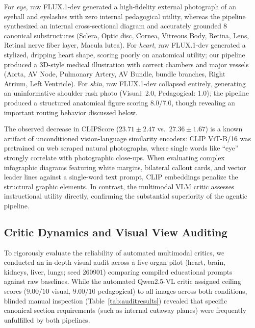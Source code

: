 \documentclass[conference]{IEEEtran}
\begin{document}
For \textit{eye}, raw FLUX.1-dev generated a high-fidelity external photograph of an eyeball and eyelashes with zero internal pedagogical utility, whereas the pipeline synthesized an internal cross-sectional diagram and accurately grounded 8 canonical substructures (Sclera, Optic disc, Cornea, Vitreous Body, Retina, Lens, Retinal nerve fiber layer, Macula lutea). For \textit{heart}, raw FLUX.1-dev generated a stylized, dripping heart shape, scoring poorly on anatomical utility; our pipeline produced a 3D-style medical illustration with correct chambers and major vessels (Aorta, AV Node, Pulmonary Artery, AV Bundle, bundle branches, Right Atrium, Left Ventricle). For \textit{skin}, raw FLUX.1-dev collapsed entirely, generating an uninformative shoulder rash photo (Visual: 2.0, Pedagogical: 1.0); the pipeline produced a structured anatomical figure scoring 8.0/7.0, though revealing an important routing behavior discussed below.

The observed decrease in CLIPScore ($23.71 \pm 2.47$ vs.\ $27.36 \pm 1.67$) is a known artifact of unconditioned vision-language similarity encoders: CLIP ViT-B/16 was pretrained on web scraped natural photographs, where single words like ``eye'' strongly correlate with photographic close-ups. When evaluating complex infographic diagrams featuring white margins, bilateral callout cards, and vector leader lines against a single-word text prompt, CLIP embeddings penalize the structural graphic elements. In contrast, the multimodal VLM critic assesses instructional utility directly, confirming the substantial superiority of the agentic pipeline.

\subsection{Critic Dynamics and Visual View Auditing}
\label{sec:pilot-audit}

To rigorously evaluate the reliability of automated multimodal critics, we conducted an in-depth visual audit across a five-organ pilot (heart, brain, kidneys, liver, lungs; seed 260901) comparing compiled educational prompts against raw baselines. While the automated Qwen2.5-VL critic assigned ceiling scores ($9.00/10$ visual, $9.00/10$ pedagogical) to all images across both conditions, blinded manual inspection (Table~\ref{tab:auditresults}) revealed that specific canonical section requirements (such as internal cutaway planes) were frequently unfulfilled by both pipelines.
\end{document}

